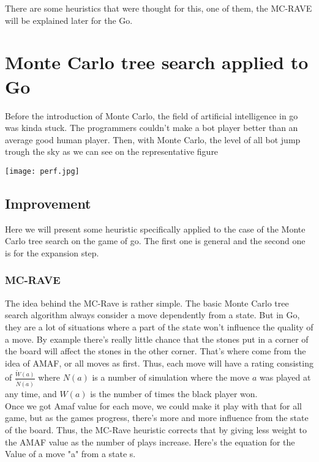 There are some heuristics that were thought for this, one of them, the MC-RAVE will be explained later for the Go. 


\section{Monte Carlo tree search applied to Go}

Before the introduction of Monte Carlo, the field of artificial intelligence in go was kinda stuck. The programmers couldn't make a bot player better than an average good human player. Then, with Monte Carlo, the level of all bot jump trough the sky as we can see on the representative figure
\begin{center}
\texttt{[image: perf.jpg]}
\end{center}
\subsection{Improvement}
Here we will present some heuristic specifically applied to the case of the Monte Carlo tree search on the game of go. 
The first one is general and the second one is for the expansion step. 

\subsubsection{MC-RAVE}

The idea behind the MC-Rave is rather simple. The basic Monte Carlo tree search algorithm always consider a move dependently from a state. But in Go, they are a lot of situations where a part of the state won't influence the quality of a move. By example there's really little chance that the stones put in a corner of the board will affect the stones in the other corner. That's where come from the idea of AMAF, or all moves as first. Thus, each move will have a rating consisting of $ \frac{\tilde{W}(a)}{\tilde{N}(a)} $ where $N(a)$ is a number of simulation where the move $a$ was played at any time, and $W(a)$ is the number of times the black player won. 
\\

Once we got Amaf value for each move, we could make it play with that for all game, but as the games progress, there's more and more influence from the state of the board. Thus, the MC-Rave heuristic corrects that by giving less weight to the AMAF value as the number of plays increase. Here's the equation for the Value of a move "a" from a state s. 

